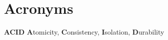 \section*{Acronyms}
	\textbf{ACID} \textbf{A}tomicity, \textbf{C}onsistency, \textbf{I}solation, \textbf{D}urability \\

\clearpage